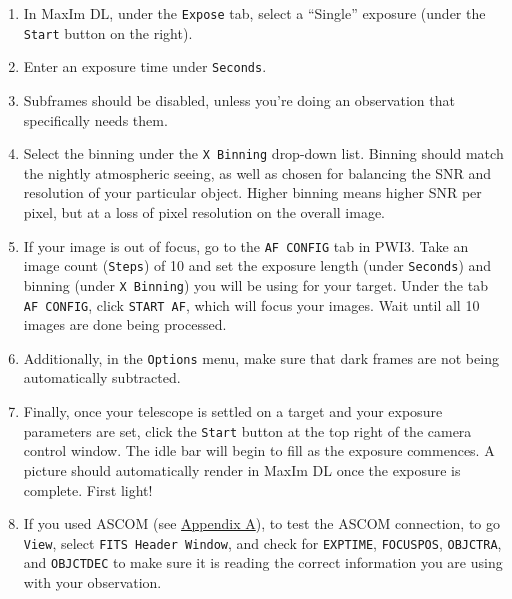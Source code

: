 \documentclass{article}
\begin{document}
	\begin{enumerate}
		
		\item In MaxIm DL, under the \texttt{Expose} tab, select a ``Single'' exposure (under the \texttt{Start} button on the right).
		
		\item Enter an exposure time under \texttt{Seconds}.
		
		\item Subframes should be disabled, unless you're doing an observation that specifically needs them.
		
		\item Select the binning under the \texttt{X Binning} drop-down list. Binning should match the nightly atmospheric seeing, as well as chosen for balancing the SNR and resolution of your particular object. Higher binning means higher SNR per pixel, but at a loss of pixel resolution on the overall image.
		
		\item If your image is out of focus, go to the \texttt{AF CONFIG} tab in PWI3. Take an image count (\texttt{Steps}) of 10 and set the exposure length (under \texttt{Seconds}) and binning (under \texttt{X Binning}) you will be using for your target. Under the tab \texttt{AF CONFIG}, click \texttt{START AF}, which will focus your images. Wait until all 10 images are done being processed.
		
		\item Additionally, in the \texttt{Options} menu, make sure that dark frames are not being automatically subtracted.
		
		\item Finally, once your telescope is settled on a target and your exposure parameters are set, click the \texttt{Start} button at the top right of the camera control window. The idle bar will begin to fill as the exposure commences. A picture should automatically render in MaxIm DL once the exposure is complete. First light!
		
		\item If you used ASCOM (see \hyperref[sec:set-up-ascom]{Appendix A}), to test the ASCOM connection, to go \texttt{View}, select \texttt{FITS Header Window}, and check for \texttt{EXPTIME}, \texttt{FOCUSPOS}, \texttt{OBJCTRA}, and \texttt{OBJCTDEC} to make sure it is reading the correct information you are using with your observation. 
		
	\end{enumerate}
	
\end{document}
